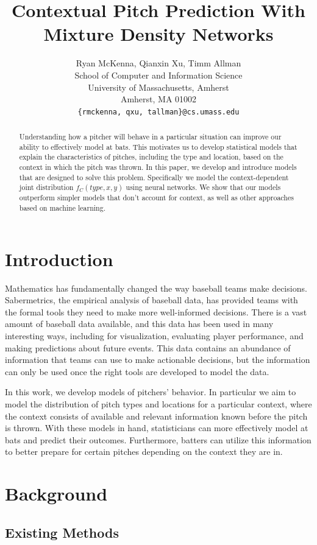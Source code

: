 \documentclass{article}
\title{Contextual Pitch Prediction With \\Mixture Density Networks}
\author{
   Ryan McKenna, Qianxin Xu, Timm Allman\\
  School of Computer and Information Science\\
  University of Massachusetts, Amherst\\
  Amherst, MA 01002\\
  \texttt{\{rmckenna, qxu, tallman\}@cs.umass.edu} \\
}
\begin{document}
\maketitle 
\begin{abstract}
Understanding how a pitcher will behave in a particular situation can improve our ability to effectively model at bats. This motivates us to develop statistical models that explain the characteristics of pitches, including the type and location, based on the context in which the pitch was thrown. In this paper, we develop and introduce models that are designed to solve this problem. Specifically we model the context-dependent joint distribution $ f_C(type, x, y) $ using neural networks. We show that our models outperform simpler models that don't account for context, as well as other approaches based on machine learning.
\end{abstract}

\section{Introduction}

Mathematics has fundamentally changed the way baseball teams make decisions. Sabermetrics, the empirical analysis of baseball data, has provided teams with the formal tools they need to make more well-informed decisions. There is a vast amount of baseball data available, and this data has been used in many interesting ways, including for visualization, evaluating player performance, and making predictions about future events. This data contains an abundance of information that teams can use to make actionable decisions, but the information can only be used once the right tools are developed to model the data.

In this work, we develop models of pitchers' behavior. In particular we aim to model the distribution of pitch types and locations for a particular context, where the context consists of available and relevant information known before the pitch is thrown. With these models in hand, statisticians can more effectively model at bats and predict their outcomes. Furthermore, batters can utilize this information to better prepare for certain pitches depending on the context they are in.  

\section{Background}

\subsection{Existing Methods}
\end{document}

